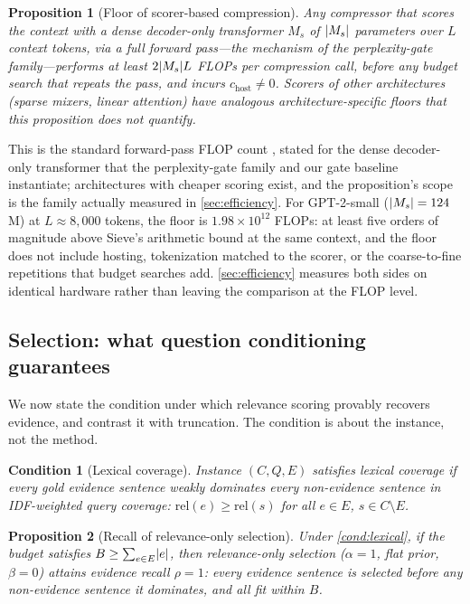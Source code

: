 \documentclass[pdflatex,sn-basic]{sn-jnl}
\DeclarePairedDelimiter\abs{\lvert}{\rvert}
\newtheorem{proposition}{Proposition}
\newtheorem{condition}{Condition}
\theoremstyle{remark}
\newcommand{\method}{Sieve}
\begin{document}
\begin{proposition}[Floor of scorer-based compression]
\label{prop:floor}
Any compressor that scores the context with a dense decoder-only
transformer $M_s$ of $\abs{M_s}$ parameters over $L$ context tokens,
via a full forward pass---the mechanism of the perplexity-gate
family---performs at least $2\abs{M_s} L$ FLOPs per compression call,
before any budget search that repeats the pass, and incurs
$c_{\mathrm{host}} \ne 0$. Scorers of other architectures (sparse
mixers, linear attention) have analogous architecture-specific floors
that this proposition does not quantify.
\end{proposition}

This is the standard forward-pass FLOP count \citep{kaplan2020scaling},
stated for the dense decoder-only transformer that the perplexity-gate
family and our gate baseline instantiate; architectures with cheaper
scoring exist, and the proposition's scope is the family actually
measured in \autoref{sec:efficiency}.
For GPT-2-small ($\abs{M_s} = 124$M) at $L \approx 8{,}000$ tokens,
the floor is $1.98 \times 10^{12}$ FLOPs: at least five orders of
magnitude above \method{}'s arithmetic bound at the same context, and
the floor does not include hosting, tokenization matched to the
scorer, or the coarse-to-fine repetitions that budget searches add.
\autoref{sec:efficiency} measures both sides on identical hardware
rather than leaving the comparison at the FLOP level.

\subsection{Selection: what question conditioning guarantees}
\label{sec:guarantees}
We now state the condition under which relevance scoring provably
recovers evidence, and contrast it with truncation. The condition is
about the instance, not the method.

\begin{condition}[Lexical coverage]
\label{cond:lexical}
Instance $(C, Q, E)$ satisfies lexical coverage if every gold
evidence sentence weakly dominates every non-evidence sentence in
IDF-weighted query coverage:
$\mathrm{rel}(e) \ge \mathrm{rel}(s)$ for all $e \in E$,
$s \in C \setminus E$.
\end{condition}

\begin{proposition}[Recall of relevance-only selection]
\label{prop:relonly}
Under \autoref{cond:lexical}, if the budget satisfies
$B \ge \sum_{e \in E} \abs{e}$, then relevance-only selection
($\alpha=1$, flat prior, $\beta=0$) attains evidence recall $\rho=1$:
every evidence sentence is selected before any non-evidence sentence
it dominates, and all fit within $B$.
\end{proposition}
\end{document}
